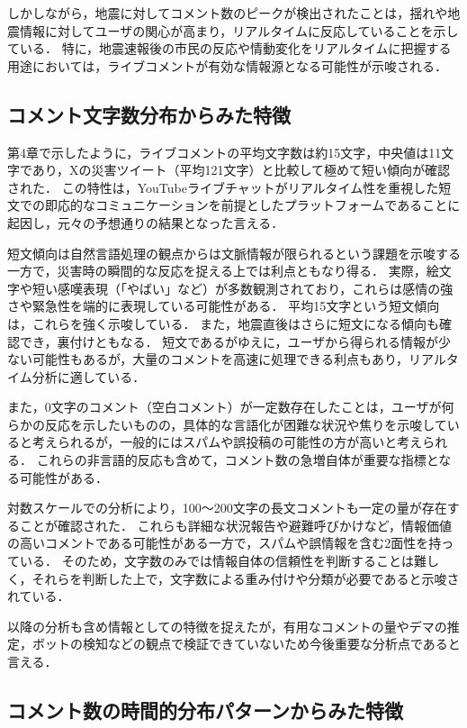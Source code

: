 しかしながら，地震に対してコメント数のピークが検出されたことは，揺れや地震情報に対してユーザの関心が高まり，リアルタイムに反応していることを示している．
特に，地震速報後の市民の反応や情動変化をリアルタイムに把握する用途においては，ライブコメントが有効な情報源となる可能性が示唆される．

\subsection{コメント文字数分布からみた特徴}

第4章で示したように，ライブコメントの平均文字数は約15文字，中央値は11文字であり，Xの災害ツイート（平均121文字）と比較して極めて短い傾向が確認された．
この特性は，YouTubeライブチャットがリアルタイム性を重視した短文での即応的なコミュニケーションを前提としたプラットフォームであることに起因し，元々の予想通りの結果となった言える．

短文傾向は自然言語処理の観点からは文脈情報が限られるという課題を示唆する一方で，災害時の瞬間的な反応を捉える上では利点ともなり得る．
実際，絵文字や短い感嘆表現（「やばい」など）が多数観測されており，これらは感情の強さや緊急性を端的に表現している可能性がある．
平均15文字という短文傾向は，これらを強く示唆している．
また，地震直後はさらに短文になる傾向も確認でき，裏付けともなる．
短文であるがゆえに，ユーザから得られる情報が少ない可能性もあるが，大量のコメントを高速に処理できる利点もあり，リアルタイム分析に適している．

また，0文字のコメント（空白コメント）が一定数存在したことは，ユーザが何らかの反応を示したいものの，具体的な言語化が困難な状況や焦りを示唆していると考えられるが，一般的にはスパムや誤投稿の可能性の方が高いと考えられる．
これらの非言語的反応も含めて，コメント数の急増自体が重要な指標となる可能性がある．

対数スケールでの分析により，100〜200文字の長文コメントも一定の量が存在することが確認された．
これらも詳細な状況報告や避難呼びかけなど，情報価値の高いコメントである可能性がある一方で，スパムや誤情報を含む2面性を持っている．
そのため，文字数のみでは情報自体の信頼性を判断することは難しく，それらを判断した上で，文字数による重み付けや分類が必要であると示唆されている．

以降の分析も含め情報としての特徴を捉えたが，有用なコメントの量やデマの推定，ボットの検知などの観点で検証できていないため今後重要な分析点であると言える．
\subsection{コメント数の時間的分布パターンからみた特徴}

